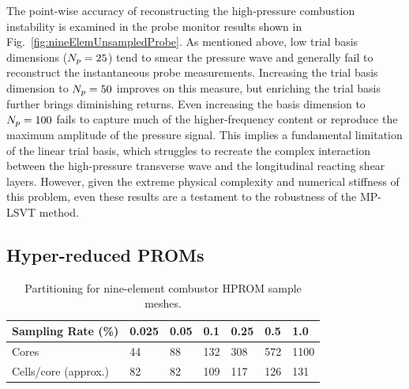The point-wise accuracy of reconstructing the high-pressure combustion instability is examined in the probe monitor results shown in Fig.~\ref{fig:nineElemUnsampledProbe}. As mentioned above, low trial basis dimensions ($N_p = 25$) tend to smear the pressure wave and generally fail to reconstruct the instantaneous probe measurements. Increasing the trial basis dimension to $N_p = 50$ improves on this measure, but enriching the trial basis further brings diminishing returns. Even increasing the basis dimension to $N_p = 100$ fails to capture much of the higher-frequency content or reproduce the maximum amplitude of the pressure signal. This implies a fundamental limitation of the linear trial basis, which struggles to recreate the complex interaction between the high-pressure transverse wave and the longitudinal reacting shear layers. However, given the extreme physical complexity and numerical stiffness of this problem, even these results are a testament to the robustness of the MP-LSVT method. 


\subsection{Hyper-reduced PROMs}

\begin{table}
	\centering
	\begin{tabular}{ lllllll }
	\toprule
	Sampling Rate (\%) & 0.025 & 0.05 & 0.1 & 0.25 & 0.5 & 1.0 \\
	\midrule
	Cores & 44 & 88 & 132 & 308 & 572 & 1100 \\
	Cells/core (approx.) & 82 & 82 & 109 & 117 & 126 & 131 \\
	\bottomrule
	\end{tabular}
	\caption{\label{tab:nineElemSampProcs}Partitioning for nine-element combustor HPROM sample meshes.}
\end{table}

